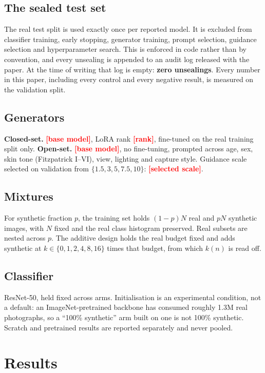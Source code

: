 \documentclass[11pt]{article}
\newcommand{\RESULT}[1]{\textcolor{red}{\textbf{[#1]}}}
\begin{document}
\subsection{The sealed test set}
The real test split is used exactly once per reported model. It is excluded from
classifier training, early stopping, generator training, prompt selection, guidance
selection and hyperparameter search. This is enforced in code rather than by
convention, and every unsealing is appended to an audit log released with the paper. At the
time of writing that log is empty: \textbf{zero unsealings}. Every number in this paper,
including every control and every negative result, is measured on the validation split.

\subsection{Generators}
\textbf{Closed-set.} \RESULT{base model}, LoRA rank \RESULT{rank}, fine-tuned on the
real training split only. \textbf{Open-set.} \RESULT{base model}, no fine-tuning,
prompted across age, sex, skin tone (Fitzpatrick I--VI), view, lighting and capture
style. Guidance scale selected on validation from
$\{1.5, 3, 5, 7.5, 10\}$: \RESULT{selected scale}.

\subsection{Mixtures}
For synthetic fraction $p$, the training set holds $(1-p)N$ real and $pN$ synthetic
images, with $N$ fixed and the real class histogram preserved. Real subsets are
nested across $p$. The additive design holds the real budget fixed and adds synthetic
at $k \in \{0,1,2,4,8,16\}$ times that budget, from which $k(n)$ is read off.

\subsection{Classifier}
ResNet-50, held fixed across arms. Initialisation is an experimental condition, not a
default: an ImageNet-pretrained backbone has consumed roughly 1.3M real photographs,
so a ``100\% synthetic'' arm built on one is not 100\% synthetic. Scratch and
pretrained results are reported separately and never pooled.

\section{Results}
\label{sec:results}
\end{document}

